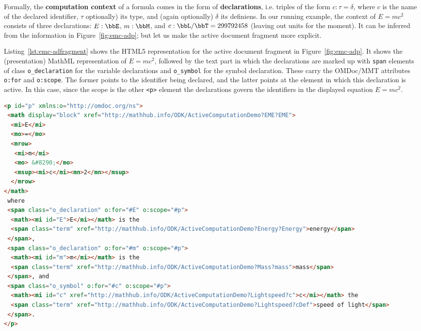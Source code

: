 Formally, the \textbf{computation context} of a formula comes in the form of
\textbf{declarations}, i.e. triples of the form $c:\tau=\delta$, where $c$ is the name of
the declared identifier, $\tau$ optionally) its type, and (again optionally) $\delta$ its
definiens. In our running example, the context of $E=mc^2$ consists of three
declarations: $E:\bbE$, $m:\bbM$, and $c:\bbL/\bbT=299 792 458$ (leaving out units for the
moment). It can be inferred from the information in Figure~\ref{fig:emc-adp}; but let us
make the active document fragment more explicit.

Listing~\ref{lst:emc-adfragment} shows the HTML5 representation for the active
document fragment in Figure~\ref{fig:emc-adp}. It shows the (presentation) MathML
representation of $E=mc^2$, followed by the text part in which the declarations are marked
up with \lstinline|span| elements of class \lstinline|o_declaration| for the variable
declarations and \lstinline|o_symbol| for the symbol declaration. These carry the
OMDoc/MMT attributes \lstinline|o:for| and \lstinline|o:scope|. The former points to the
identifier being declared, and the latter points at the element in which this declaration
is active. In this case, since the scope is the other \lstinline|<p>| element the
declarations govern the identifiers in the displayed equation $E=mc^2$.

\begin{lstlisting}[label=lst:emc-adfragment,caption=Native Markup for an Active Document Fragment,
language=HTML,basicstyle=\footnotesize\sf,mathescape,morekeywords={mi,mo,msup,math,mrow}]
<p id="p" xmlns:o="http://omdoc.org/ns">
 <math display="block" xref="http://mathhub.info/ODK/ActiveComputationDemo?EME?EME">
  <mi>E</mi>
  <mo>=</mo>
  <mrow>
   <mi>m</mi>
   <mo> &#8290;</mo>
   <msup><mi>c</mi><mn>2</mn></msup>
  </mrow>
</math>
 where
 <span class="o_declaration" o:for="#E" o:scope="#p">
  <math><mi id="E">E</mi></math> is the
  <span class="term" xref="http://mathhub.info/ODK/ActiveComputationDemo?Energy?Energy">energy</span>
 </span>,
 <span class="o_declaration" o:for="#m" o:scope="#p">
  <math><mi id="m">m</mi></math> is the
  <span class="term" xref="http://mathhub.info/ODK/ActiveComputationDemo?Mass?mass">mass</span>
 </span>, and
 <span class="o_symbol" o:for="#c" o:scope="#p">
  <math><mi id="c" xref="http://mathhub.info/ODK/ActiveComputationDemo?Lightspeed?c">c</mi></math> the
  <span class="term" xref="http://mathhub.info/ODK/ActiveComputationDemo?Lightspeed?cDef">speed of light</span>
 </span>.
</p>
\end{lstlisting}

